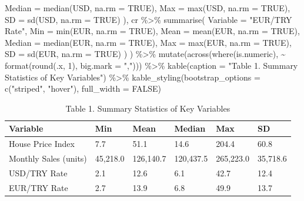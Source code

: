 \documentclass[
  11pt,
  a4paper,
]{article}
\newenvironment{Shaded}{\begin{snugshade}}{\end{snugshade}}
\newcommand{\AttributeTok}[1]{\textcolor[rgb]{0.40,0.45,0.13}{#1}}
\newcommand{\ConstantTok}[1]{\textcolor[rgb]{0.56,0.35,0.01}{#1}}
\newcommand{\DecValTok}[1]{\textcolor[rgb]{0.68,0.00,0.00}{#1}}
\newcommand{\FunctionTok}[1]{\textcolor[rgb]{0.28,0.35,0.67}{#1}}
\newcommand{\NormalTok}[1]{\textcolor[rgb]{0.00,0.23,0.31}{#1}}
\newcommand{\SpecialCharTok}[1]{\textcolor[rgb]{0.37,0.37,0.37}{#1}}
\newcommand{\StringTok}[1]{\textcolor[rgb]{0.13,0.47,0.30}{#1}}
\begin{document}
\begin{Shaded}
\begin{Highlighting}[]
    \AttributeTok{Median   =} \FunctionTok{median}\NormalTok{(USD, }\AttributeTok{na.rm =} \ConstantTok{TRUE}\NormalTok{),}
    \AttributeTok{Max      =} \FunctionTok{max}\NormalTok{(USD, }\AttributeTok{na.rm =} \ConstantTok{TRUE}\NormalTok{),}
    \AttributeTok{SD       =} \FunctionTok{sd}\NormalTok{(USD, }\AttributeTok{na.rm =} \ConstantTok{TRUE}\NormalTok{)}
\NormalTok{  ),}
\NormalTok{  cr }\SpecialCharTok{\%\textgreater{}\%} \FunctionTok{summarise}\NormalTok{(}
    \AttributeTok{Variable =} \StringTok{"EUR/TRY Rate"}\NormalTok{,}
    \AttributeTok{Min      =} \FunctionTok{min}\NormalTok{(EUR, }\AttributeTok{na.rm =} \ConstantTok{TRUE}\NormalTok{),}
    \AttributeTok{Mean     =} \FunctionTok{mean}\NormalTok{(EUR, }\AttributeTok{na.rm =} \ConstantTok{TRUE}\NormalTok{),}
    \AttributeTok{Median   =} \FunctionTok{median}\NormalTok{(EUR, }\AttributeTok{na.rm =} \ConstantTok{TRUE}\NormalTok{),}
    \AttributeTok{Max      =} \FunctionTok{max}\NormalTok{(EUR, }\AttributeTok{na.rm =} \ConstantTok{TRUE}\NormalTok{),}
    \AttributeTok{SD       =} \FunctionTok{sd}\NormalTok{(EUR, }\AttributeTok{na.rm =} \ConstantTok{TRUE}\NormalTok{)}
\NormalTok{  )}
\NormalTok{) }\SpecialCharTok{\%\textgreater{}\%}
  \FunctionTok{mutate}\NormalTok{(}\FunctionTok{across}\NormalTok{(}\FunctionTok{where}\NormalTok{(is.numeric), }\SpecialCharTok{\textasciitilde{}} \FunctionTok{format}\NormalTok{(}\FunctionTok{round}\NormalTok{(.x, }\DecValTok{1}\NormalTok{), }\AttributeTok{big.mark =} \StringTok{","}\NormalTok{))) }\SpecialCharTok{\%\textgreater{}\%}
  \FunctionTok{kable}\NormalTok{(}\AttributeTok{caption =} \StringTok{"Table 1. Summary Statistics of Key Variables"}\NormalTok{) }\SpecialCharTok{\%\textgreater{}\%}
  \FunctionTok{kable\_styling}\NormalTok{(}\AttributeTok{bootstrap\_options =} \FunctionTok{c}\NormalTok{(}\StringTok{"striped"}\NormalTok{, }\StringTok{"hover"}\NormalTok{), }\AttributeTok{full\_width =} \ConstantTok{FALSE}\NormalTok{)}
\end{Highlighting}
\end{Shaded}

\begin{longtable}[t]{llllll}
\caption{\label{tab:eda-summary}Table 1. Summary Statistics of Key Variables}\\
\toprule
Variable & Min & Mean & Median & Max & SD\\
\midrule
House Price Index & 7.7 & 51.1 & 14.6 & 204.4 & 60.8\\
Monthly Sales (units) & 45,218.0 & 126,140.7 & 120,437.5 & 265,223.0 & 35,718.6\\
USD/TRY Rate & 2.1 & 12.6 & 6.1 & 42.7 & 12.4\\
EUR/TRY Rate & 2.7 & 13.9 & 6.8 & 49.9 & 13.7\\
\bottomrule
\end{longtable}
\end{document}
